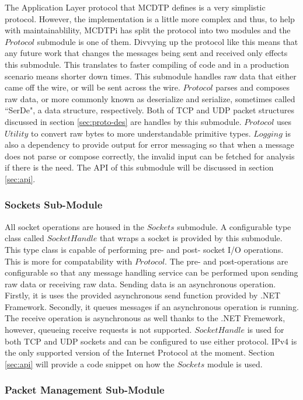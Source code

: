 The Application Layer protocol that MCDTP defines is a very simplistic protocol. However, the implementation is a little more complex and thus, to help with maintainablility, MCDTPi has split the protocol into two modules and the $Protocol$ submodule is one of them. Divvying up the protocol like this means that any future work that changes the messages being sent and received only effects this submodule. This translates to faster compiling of code and in a production scenario means shorter down times. This submodule handles raw data that either came off the wire, or will be sent across the wire. $Protocol$ parses and composes raw data, or more commonly known as deserialize and serialize, sometimes called ``SerDe", a data structure, respectively. Both of TCP and UDP packet structures discussed in section \ref{sec:proto-des} are handles by this submodule. $Protocol$ uses $Utility$ to convert raw bytes to more understandable primitive types. $Logging$ is also a dependency to provide output for error messaging so that when a message does not parse or compose correctly, the invalid input can be fetched for analysis if there is the need. The API of this submodule will be discussed in section \ref{sec:api}.

\subsubsection{Sockets Sub-Module}

All socket operations are housed in the $Sockets$ submodule. A configurable type class called $SocketHandle$ that wraps a socket is provided by this submodule. This type class is capable of performing pre- and post- socket I/O operations. This is more for compatability with $Protocol$. The pre- and post-operations are configurable so that any message handling service can be performed upon sending raw data or receiving raw data. Sending data is an asynchronous operation. Firstly, it is uses the provided asynchronous send function provided by .NET Framework. Secondly, it queues messages if an asynchronous operation is running. The receive operation is asynchronous as well thanks to the .NET Fremework, however, queueing receive requests is not supported. $SocketHandle$ is used for both TCP and UDP sockets and can be configured to use either protocol. IPv4 is the only supported version of the Internet Protocol at the moment. Section \ref{sec:api} will provide a code snippet on how the $Sockets$ module is used.

\subsubsection{Packet Management Sub-Module}\label{sec:pm-sm}

